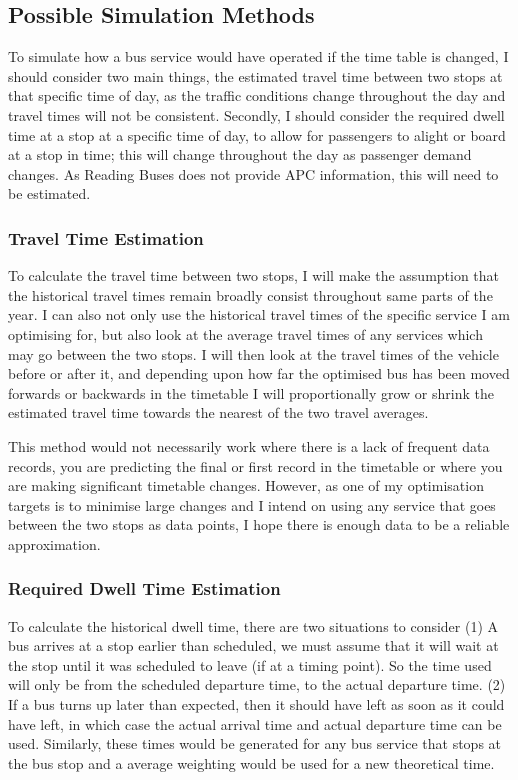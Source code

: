\documentclass{article}
\begin{document}
\subsection{Possible Simulation Methods}
To simulate how a bus service would have operated if the time table is changed, I should consider two main things, the estimated travel time between two stops at that specific time of day, as the traffic conditions change throughout the day and travel times will not be consistent. Secondly, I should consider the required dwell time at a stop at a specific time of day, to allow for passengers to alight or board at a stop in time; this will change throughout the day as passenger demand changes. As Reading Buses does not provide APC information, this will need to be estimated. 

\subsubsection{Travel Time Estimation}
\par 
To calculate the travel time between two stops, I will make the assumption that the historical travel times remain broadly consist throughout same parts of the year. I can also not only use the historical travel times of the specific service I am optimising for, but also look at the average travel times of any services which may go between the two stops. I will then look at the travel times of the vehicle before or after it, and depending upon how far the optimised bus has been moved forwards or backwards in the timetable I will proportionally grow or shrink the estimated travel time towards the nearest of the two travel averages. 

\par 
This method would not necessarily work where there is a lack of frequent data records, you are predicting the final or first record in the timetable or where you are making significant timetable changes. However, as one of my optimisation targets is to minimise large changes and I intend on using any service that goes between the two stops as data points, I hope there is enough data to be a reliable approximation. 

\subsubsection{Required Dwell Time Estimation}
\par
To calculate the historical dwell time, there are two situations to consider (1) A bus arrives at a stop earlier than scheduled, we must assume that it will wait at the stop until it was scheduled to leave (if at a timing point). So the time used will only be from the scheduled departure time, to the actual departure time. (2) If a bus turns up later than expected, then it should have left as soon as it could have left, in which case the actual arrival time and actual departure time can be used. Similarly, these times would be generated for any bus service that stops at the bus stop and a average weighting would be used for a new theoretical time.
\end{document}
